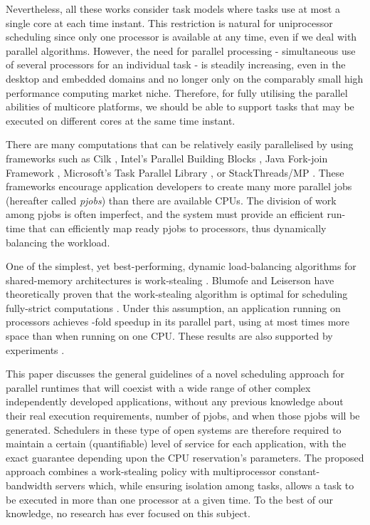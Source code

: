 \documentclass[10pt,twocolumn]{article}
\begin{document}
Nevertheless, all these works consider task models where tasks use at most a single core at each time instant. This restriction is natural for uniprocessor scheduling since only one processor is available at any time, even if we deal with parallel algorithms. However, the need for parallel processing - simultaneous use of several processors for an individual task - is steadily increasing, even in the desktop and embedded domains and no longer only on the comparably small high performance computing market niche. Therefore, for fully utilising the parallel abilities of multicore platforms, we should be able to support tasks that may be executed on different cores at the same time instant.

There are many computations that can be relatively easily parallelised by using frameworks such as Cilk \cite{frigo98}, Intel's Parallel Building Blocks \cite{intelpbb}, Java Fork-join Framework \cite{lea00}, Microsoft's Task Parallel Library \cite{microsofttpl}, or StackThreads/MP \cite{taura99}. These frameworks encourage application developers to create many more parallel jobs (hereafter called \emph{pjobs}) than there are available CPUs. The division of work among pjobs is often imperfect, and the system must provide an efficient run-time that can efficiently map ready pjobs to processors, thus dynamically balancing the workload. 

One of the simplest, yet best-performing, dynamic load-balancing algorithms for shared-memory architectures is work-stealing \cite{blumofe99}. Blumofe and Leiserson have theoretically proven that the work-stealing algorithm is optimal for scheduling fully-strict computations \cite{blumofe99}. Under this assumption, an application running on  processors achieves -fold speedup in its parallel part, using at most  times more space than when running on one CPU. These results are also supported by experiments \cite{saha07}.

This paper discusses the general guidelines of a novel scheduling approach for parallel runtimes that will coexist with a wide range of other complex independently developed applications, without any previous knowledge about their real execution requirements, number of pjobs, and when those pjobs will be generated. Schedulers in these type of open systems are therefore required to maintain a certain (quantifiable) level of service for each application, with the exact guarantee depending upon the CPU reservation's parameters. The proposed approach combines a work-stealing policy with multiprocessor constant-bandwidth servers which, while ensuring isolation among tasks, allows a task to be executed in more than one processor at a given time. To the best of our knowledge, no research has ever focused on this subject. 
\end{document}
